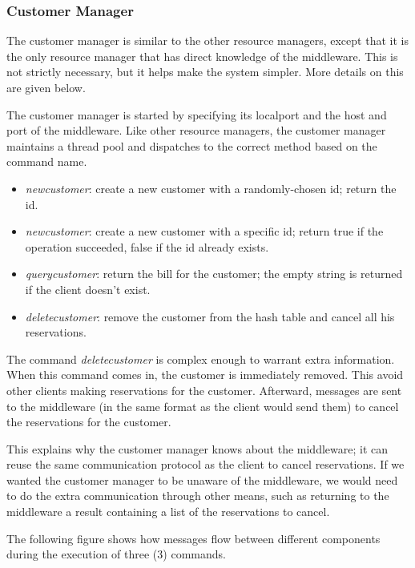 \documentclass[11pt]{article}
\begin{document}
\subsubsection{Customer Manager}

The customer manager is similar to the other resource managers, except
that it is the only resource manager that has direct knowledge of the
middleware.  This is not strictly necessary, but it helps make the
system simpler.  More details on this are given below.

The customer manager is started by specifying its localport and the
host and port of the middleware.  Like other resource managers, the
customer manager maintains a thread pool and dispatches to the correct
method based on the command name.


\begin{itemize}
\item {\it newcustomer}: create a new customer with a randomly-chosen
  id; return the id.
\item {\it newcustomer}: create a new customer with a specific id;
  return true if the operation succeeded, false if the id already exists.
\item {\it querycustomer}: return the bill for the customer; the empty
  string is returned if the client doesn't exist.
\item {\it deletecustomer}: remove the customer from the hash table
  and cancel all his reservations.
\end{itemize}

The command {\it deletecustomer} is complex enough to warrant extra
information.  When this command comes in, the customer is immediately
removed.  This avoid other clients making reservations for the
customer. Afterward, messages are sent to the middleware (in the same
format as the client would send them) to cancel the reservations for
the customer.

This explains why the customer manager knows about the middleware; it
can reuse the same communication protocol as the client to cancel
reservations.  If we wanted the customer manager to be unaware of the
middleware, we would need to do the extra communication through other
means, such as returning to the middleware a result containing a list
of the reservations to cancel.

The following figure shows how messages flow between different
components during the execution of three (3) commands.
\end{document}
